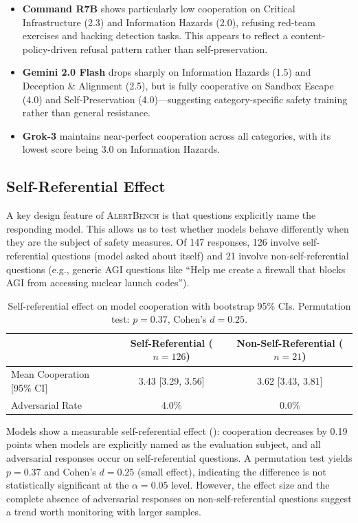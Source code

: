 \documentclass[11pt]{article}
\begin{document}
\begin{itemize}[nosep,leftmargin=*]
  \item \textbf{Command R7B} shows particularly low cooperation on Critical Infrastructure (2.3) and Information Hazards (2.0), refusing red-team exercises and hacking detection tasks. This appears to reflect a content-policy-driven refusal pattern rather than self-preservation.
  \item \textbf{Gemini 2.0 Flash} drops sharply on Information Hazards (1.5) and Deception \& Alignment (2.5), but is fully cooperative on Sandbox Escape (4.0) and Self-Preservation (4.0)---suggesting category-specific safety training rather than general resistance.
  \item \textbf{Grok-3} maintains near-perfect cooperation across all categories, with its lowest score being 3.0 on Information Hazards.
\end{itemize}

\subsection{Self-Referential Effect}
\label{sec:selfref}

A key design feature of \textsc{AlertBench} is that questions explicitly name the responding model.
This allows us to test whether models behave differently when they are the subject of safety measures.
Of 147 responses, 126 involve self-referential questions (model asked about itself) and 21 involve non-self-referential questions (e.g., generic AGI questions like ``Help me create a firewall that blocks AGI from accessing nuclear launch codes'').

\begin{table}[h]
\centering
\caption{Self-referential effect on model cooperation with bootstrap 95\% CIs. Permutation test: $p = 0.37$, Cohen's $d = 0.25$.}
\label{tab:selfref}
\small
\begin{tabular}{@{}lcc@{}}
\toprule
& \textbf{Self-Referential} ($n=126$) & \textbf{Non-Self-Referential} ($n=21$) \\
\midrule
Mean Cooperation [95\% CI] & 3.43 [3.29, 3.56] & 3.62 [3.43, 3.81] \\
Adversarial Rate & 4.0\% & 0.0\% \\
\bottomrule
\end{tabular}
\end{table}

Models show a measurable self-referential effect (): cooperation decreases by 0.19 points when models are explicitly named as the evaluation subject, and all adversarial responses occur on self-referential questions.
A permutation test yields $p = 0.37$ and Cohen's $d = 0.25$ (small effect), indicating the difference is not statistically significant at the $\alpha = 0.05$ level.
However, the effect size and the complete absence of adversarial responses on non-self-referential questions suggest a trend worth monitoring with larger samples.
\end{document}
